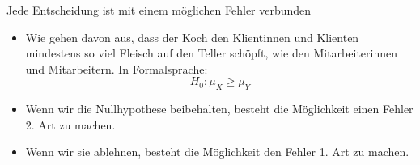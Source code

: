 \documentclass[usenames,dvipsnames,handout]{beamer}
\begin{document}

\begin{frame}{Jede Entscheidung ist mit einem möglichen Fehler verbunden}

\begin{itemize}
\item{Wie gehen davon aus, dass der Koch den Klientinnen und Klienten mindestens so viel Fleisch auf den Teller
schöpft, wie den Mitarbeiterinnen und Mitarbeitern. In Formalsprache: $$H_{0}: \mu_{X} \geq \mu_{Y}$$ }\pause
\item{Wenn wir die Nullhypothese beibehalten, besteht die Möglichkeit einen Fehler 2. Art zu machen.}\pause
\item{Wenn wir sie ablehnen, besteht die Möglichkeit den Fehler 1. Art zu machen.}
\end{itemize}
\end{frame}
\end{document}
